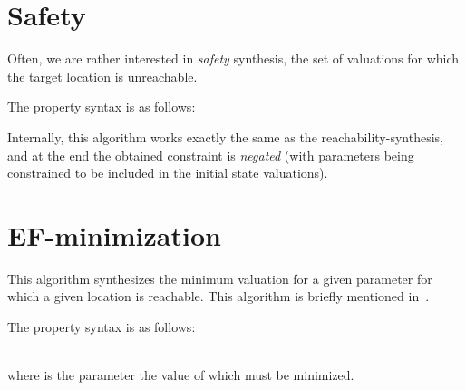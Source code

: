 %
%
%
%



\section{Safety}\label{ss:mode:EF}

Often, we are rather interested in \emph{safety} synthesis, \ie{} the set of valuations for which the target location is unreachable.

%

The property syntax is as follows:


Internally, this algorithm works exactly the same as the reachability-synthesis, and at the end the obtained constraint is \emph{negated} (with parameters being constrained to be included in the initial state valuations).


\section{EF-minimization}\label{ss:mode:EFmin}

This algorithm synthesizes the minimum valuation for a given parameter for which a given location is reachable.
This algorithm is briefly mentioned in~\cite{ABPV19}.

The property syntax is as follows:

\\
where  is the parameter the value of which must be minimized.



